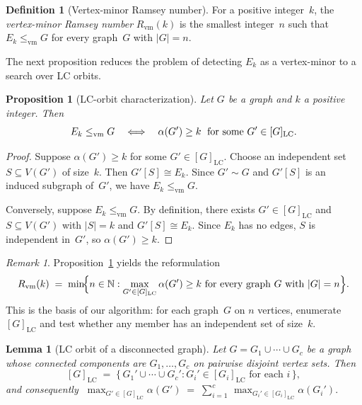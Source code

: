 \documentclass[11pt]{amsart}
\newtheorem{proposition}[theorem]{Proposition}
\newtheorem{lemma}[theorem]{Lemma}
\theoremstyle{definition}
\newtheorem{definition}[theorem]{Definition}
\theoremstyle{remark}
\newtheorem{remark}[theorem]{Remark}
\newcommand{\Rvm}{R_{\mathrm{vm}}}
\newcommand{\LC}{\mathrm{LC}}
\newcommand{\vm}{\leq_{\mathrm{vm}}}
\begin{document}
\begin{definition}[Vertex-minor Ramsey number]\label{def:Rvm}
  For a positive integer~$k$, the \emph{vertex-minor Ramsey number}
  $\Rvm(k)$ is the smallest integer~$n$ such that $E_k\vm G$ for every
  graph~$G$ with $|G|=n$.
\end{definition}

\noindent
The next proposition reduces the problem of detecting $E_k$ as a
vertex-minor to a search over LC orbits.

\begin{proposition}[LC-orbit characterization]\label{prop:alpha}
  Let $G$ be a graph and $k$ a positive integer.  Then
  \[
    E_k \vm G
    \quad\Longleftrightarrow\quad
    \alpha(G') \geq k
    \text{\; for some $G' \in [G]_{\LC}$.}
  \]
\end{proposition}

\begin{proof}
  Suppose $\alpha(G')\geq k$ for some $G'\in[G]_{\LC}$.  Choose an
  independent set $S\subseteq V(G')$ of size~$k$.  Then $G'[S]\cong
  E_k$.  Since $G'\sim G$ and $G'[S]$ is an induced subgraph of~$G'$,
  we have $E_k\vm G$.

  Conversely, suppose $E_k\vm G$.  By definition, there exists
  $G'\in[G]_{\LC}$ and $S\subseteq V(G')$ with $|S|=k$ and $G'[S]\cong
  E_k$.  Since $E_k$ has no edges, $S$ is independent in~$G'$, so
  $\alpha(G')\geq k$.
\end{proof}

\begin{remark}\label{rmk:reformulation}
  Proposition~\ref{prop:alpha} yields the reformulation
  \[
    \Rvm(k)
    \;=\;
    \min\!\Bigl\{
      n\in\mathbb{N} :
      \max_{G'\in[G]_{\LC}}\alpha(G') \geq k
      \text{ for every graph $G$ with $|G|=n$}
    \Bigr\}.
  \]
  This is the basis of our algorithm: for each graph~$G$ on $n$
  vertices, enumerate $[G]_{\LC}$ and test whether any member has an
  independent set of size~$k$.
\end{remark}

\begin{lemma}[LC orbit of a disconnected graph]\label{lem:disconnected}
  Let $G=G_1\cup\cdots\cup G_c$ be a graph whose connected components
  are $G_1,\dots,G_c$ on pairwise disjoint vertex sets.  Then
  \[
    [G]_{\LC}
    \;=\;
    \bigl\{\,G_1'\cup\cdots\cup G_c' :
             G_i'\in[G_i]_{\LC}\text{ for each }i\,\bigr\},
  \]
  and consequently
  $\;\displaystyle
    \max_{G'\in[G]_{\LC}}\alpha(G')
    \;=\;
    \sum_{i=1}^{c}\,\max_{G_i'\in[G_i]_{\LC}}\alpha(G_i').
  $
\end{lemma}
\end{document}
